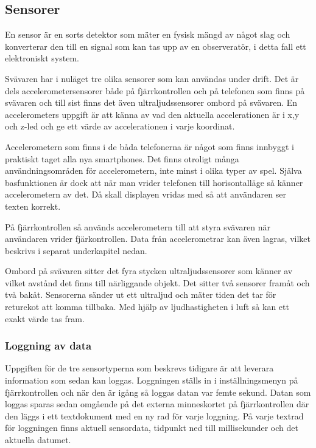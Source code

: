 \subsection{Sensorer}
En sensor är en sorts detektor som mäter en fysisk mängd av något slag och konverterar den till en signal som kan tas 
upp av en observeratör, i detta fall ett elektroniskt system.

Svävaren har i nuläget tre olika sensorer som kan användas under drift. Det är dels accelerometersensorer både 
på fjärrkontrollen och på telefonen som finns på svävaren och till sist finns det även ultraljudssensorer ombord på 
svävaren. En accelerometers uppgift är att känna av vad den aktuella accelerationen är i x,y och z-led och ge ett värde 
av accelerationen i varje koordinat.

Accelerometern som finns i de båda telefonerna är något som finns innbyggt i praktiskt taget alla nya smartphones. 
Det finns otroligt många användningsområden för accelerometern, inte minst i olika typer av spel. 
Själva basfunktionen är dock att när man vrider telefonen till horisontalläge så känner accelerometern av det. 
Då skall displayen vridas med så att användaren ser texten korrekt.

På fjärrkontrollen så används accelerometern till att styra svävaren när
användaren vrider fjärkontrollen.
Data från accelerometrar kan även lagras, vilket beskrivs i separat
underkapitel nedan.

Ombord på svävaren sitter det fyra stycken ultraljudssensorer som känner av vilket avstånd det finns till närliggande 
objekt. Det sitter två sensorer framåt och två bakåt. Sensorerna sänder ut ett ultraljud och mäter tiden det tar för 
returekot att komma tillbaka. Med hjälp av ljudhastigheten i luft så kan ett exakt värde tas fram.

\subsubsection{Loggning av data}
Uppgiften för de tre sensortyperna som beskrevs tidigare är att leverara information som sedan kan loggas. 
Loggningen ställs in i inställningsmenyn på fjärrkontrollen och när den är igång så loggas datan var femte sekund. 
Datan som loggas sparas sedan omgående på det externa minneskortet på fjärrkontrollen där den läggs i ett textdokument 
med en ny rad för varje loggning. På varje textrad för loggningen finns aktuell sensordata, tidpunkt ned till 
millisekunder och det aktuella datumet.

